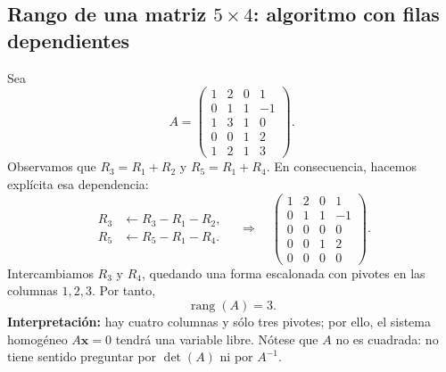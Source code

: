 \documentclass[12pt]{article}
\theoremstyle{remark}
\newcommand{\rang}{\operatorname{rang}}
\newcommand{\vect}[1]{\boldsymbol{#1}}
\begin{document}
\subsection*{Rango de una matriz $5\times4$: algoritmo con filas dependientes}
Sea
\[
A=\begin{pmatrix}
1&2&0&1\\0&1&1&-1\\1&3&1&0\\0&0&1&2\\1&2&1&3
\end{pmatrix}.
\]
Observamos que $R_3=R_1+R_2$ y $R_5=R_1+R_4$. En consecuencia, hacemos explícita esa dependencia:
\[
\begin{aligned}
R_3&\leftarrow R_3-R_1-R_2,\\
R_5&\leftarrow R_5-R_1-R_4.
\end{aligned}
\quad\Longrightarrow\quad
\begin{pmatrix}
1&2&0&1\\0&1&1&-1\\0&0&0&0\\0&0&1&2\\0&0&0&0
\end{pmatrix}.
\]
Intercambiamos $R_3$ y $R_4$, quedando una forma escalonada con pivotes en las columnas $1,2,3$. Por tanto,
\[\boxed{\rang(A)=3.}\]
\textbf{Interpretación:} hay cuatro columnas y sólo tres pivotes; por ello, el sistema homogéneo $A\vect x=0$ tendrá una variable libre. Nótese que $A$ no es cuadrada: no tiene sentido preguntar por $\det(A)$ ni por $A^{-1}$.
\end{document}
